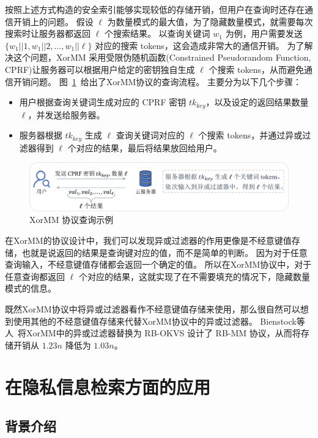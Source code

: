 按照上述方式构造的安全索引能够实现较低的存储开销，但用户在查询时还存在通信开销上的问题。
假设 $\ell$ 为数量模式的最大值，为了隐藏数量模式，就需要每次搜索时让服务器都返回 $\ell$ 个搜索结果。
以查询关键词 $w_1$ 为例，用户需要发送 $\{w_1 || 1, w_1 ||2, \dots, w_1 || \ell \}$ 对应的搜索 tokens，这会造成非常大的通信开销。
为了解决这个问题，XorMM 采用受限伪随机函数(Constrained Pseudorandom Function, CPRF)让服务器可以根据用户给定的密钥独自生成 $\ell$ 个搜索 tokens，从而避免通信开销问题。
图~\ref{fig:xormm_example}~给出了XorMM协议的查询流程。
主要分为以下几个步骤：
\begin{itemize}
  \item 用户根据查询关键词生成对应的 CPRF 密钥 $tk_{key}$，以及设定的返回结果数量 $\ell$，并发送给服务器。
  \item 服务器根据 $tk_{key}$ 生成 $\ell$ 查询关键词对应的 $\ell$ 个搜索 tokens，并通过异或过滤器得到 $\ell$ 个对应的结果，最后将结果放回给用户。
\end{itemize}
\begin{figure}[ht]
  \centering
  \includegraphics[width=\textwidth]{figures/xormm_exp.pdf}
  \caption{XorMM 协议查询示例}
  \label{fig:xormm_example}
\end{figure}

在XorMM的协议设计中，我们可以发现异或过滤器的作用更像是不经意键值存储，也就是说返回的结果是查询键对应的值，而不是简单的判断。
因为对于任意查询输入，不经意键值存储都会返回一个确定的值。
所以在XorMM协议中，对于任意查询都返回 $\ell$ 个对应的结果，这就实现了在不需要填充的情况下，隐藏数量模式的信息。

既然XorMM协议中将异或过滤器看作不经意键值存储来使用，那么很自然可以想到使用其他的不经意键值存储来代替XorMM协议中的异或过滤器。
Bienstock等人~\cite{bienstock2023NearOptimal}将XorMM中的异或过滤器替换为 RB-OKVS 设计了 RB-MM 协议，从而将存储开销从 $1.23n$ 降低为 $1.03n$。

\section{在隐私信息检索方面的应用}

\subsection{背景介绍}

